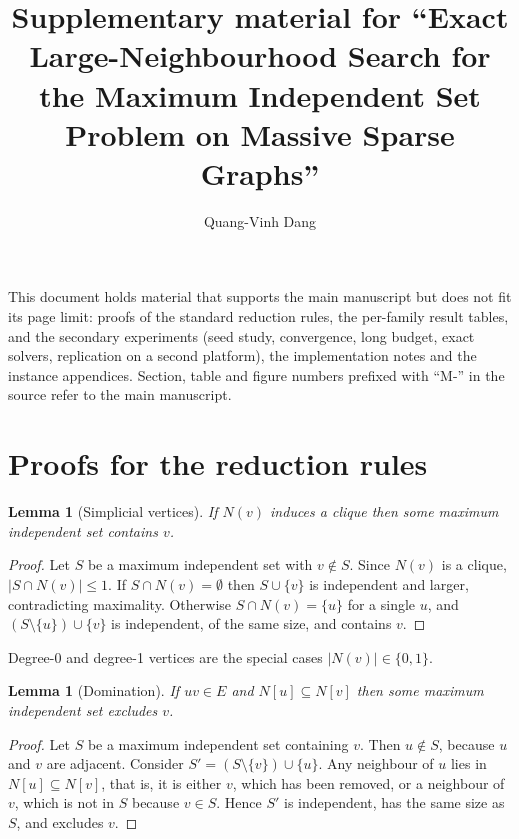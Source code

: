 \documentclass[preprint,authoryear,11pt]{elsarticle}
\newtheorem{lemma}[theorem]{Lemma}
\theoremstyle{definition}
\begin{document}
\begin{frontmatter}
\title{Supplementary material for ``Exact Large-Neighbourhood Search for the
Maximum Independent Set Problem on Massive Sparse Graphs''}
\author{Quang-Vinh Dang}
\end{frontmatter}

This document holds material that supports the main manuscript but does not fit
its page limit: proofs of the standard reduction rules, the per-family result
tables, and the secondary experiments (seed study, convergence, long budget,
exact solvers, replication on a second platform), the implementation notes and the
instance appendices. Section, table and figure numbers prefixed with ``M-'' in the
source refer to the main manuscript.

\section{Proofs for the reduction rules}
\begin{lemma}[Simplicial vertices]
\label{lem:simplicial}
If $N(v)$ induces a clique then some maximum independent set contains $v$.
\end{lemma}

\begin{proof}
Let $S$ be a maximum independent set with $v \notin S$. Since $N(v)$ is a
clique, $|S \cap N(v)| \le 1$. If $S \cap N(v) = \emptyset$ then $S \cup \{v\}$
is independent and larger, contradicting maximality. Otherwise
$S \cap N(v) = \{u\}$ for a single $u$, and $(S \setminus \{u\}) \cup \{v\}$ is
independent, of the same size, and contains $v$.
\end{proof}

Degree-0 and degree-1 vertices are the special cases $|N(v)| \in \{0,1\}$.

\begin{lemma}[Domination]
\label{lem:domination}
If $uv \in E$ and $N[u] \subseteq N[v]$ then some maximum independent set
excludes $v$.
\end{lemma}

\begin{proof}
Let $S$ be a maximum independent set containing $v$. Then $u \notin S$, because
$u$ and $v$ are adjacent. Consider $S' = (S \setminus \{v\}) \cup \{u\}$. Any
neighbour of $u$ lies in $N[u] \subseteq N[v]$, that is, it is either $v$, which
has been removed, or a neighbour of $v$, which is not in $S$ because $v \in S$.
Hence $S'$ is independent, has the same size as $S$, and excludes $v$.
\end{proof}
\end{document}
